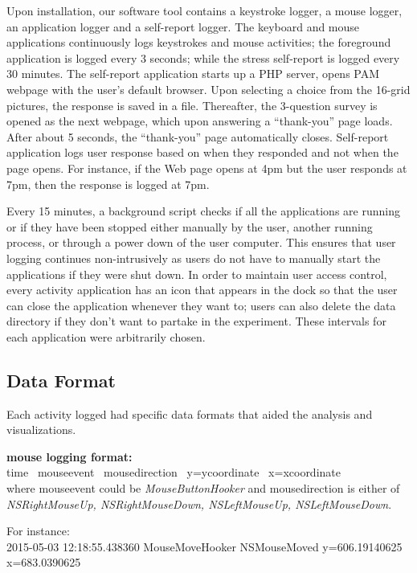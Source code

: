 \documentclass{article}
\begin{document}
Upon installation, our software tool contains a keystroke logger, a mouse logger, an application logger and a self-report logger. The keyboard and mouse applications continuously logs keystrokes and mouse activities; the foreground application is logged every 3 seconds; while the stress self-report is logged every 30 minutes. The self-report application starts up a PHP server, opens PAM webpage with the user's default browser. Upon selecting a choice from the 16-grid pictures, the response is saved in a file. Thereafter, the 3-question survey is opened as the next webpage, which upon answering a ``thank-you'' page loads. After about 5 seconds, the ``thank-you'' page automatically closes. Self-report application logs user response based on when they responded and not when the page opens. For instance, if the Web page opens at 4pm but the user responds at 7pm, then the response is logged at 7pm. 

Every 15 minutes, a background script checks if all the applications are running or if they have been stopped either manually by the user, another running process, or through a power down of the user computer. This ensures that user logging continues non-intrusively as users do not have to manually start the applications if they were shut down. In order to maintain user access control, every activity application has an icon that appears in the dock so that the user can close the application whenever they want to; users can also delete the data directory if they don't want to partake in the experiment. These intervals for each application were arbitrarily chosen. 

\subsection{Data Format}
Each activity logged had specific data formats that aided the analysis and visualizations. 

\textbf{mouse logging format:}\\
	time 
	\textpipe \  mouse\textunderscore event  
	\textpipe  \  mouse\textunderscore direction  
	\textpipe \  y=y\textunderscore coordinate \   x=x\textunderscore coordinate\\
	where mouse\textunderscore event could be \textit{MouseButtonHooker} and
	mouse\textunderscore direction is either of \textit{NSRightMouseUp, NSRightMouseDown, NSLeftMouseUp, NSLeftMouseDown}.
	
For instance: \\
2015-05-03 12:18:55.438360 
MouseMoveHooker 
NSMouseMoved 
y=606.19140625 x=683.0390625
\end{document}
